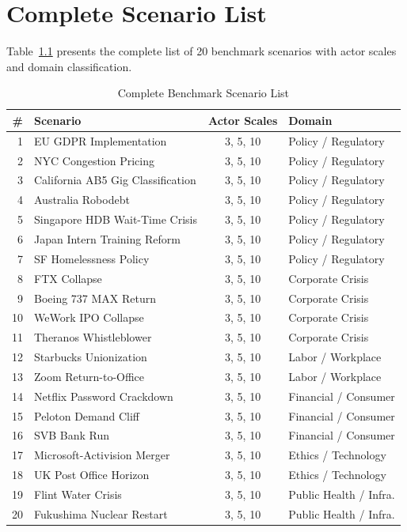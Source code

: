 \documentclass[12pt, a4paper]{report}
\begin{document}
\chapter{Complete Scenario List}
\label{app:scenarios}

Table~\ref{tab:full_scenarios} presents the complete list of 20 benchmark scenarios with actor scales and domain classification.

\begin{table}[t]
\centering
\caption{Complete Benchmark Scenario List}
\label{tab:full_scenarios}
\small
\begin{tabular}{rlcl}
\toprule
\# & Scenario & Actor Scales & Domain \\
\midrule
1  & EU GDPR Implementation & 3, 5, 10 & Policy / Regulatory \\
2  & NYC Congestion Pricing & 3, 5, 10 & Policy / Regulatory \\
3  & California AB5 Gig Classification & 3, 5, 10 & Policy / Regulatory \\
4  & Australia Robodebt & 3, 5, 10 & Policy / Regulatory \\
5  & Singapore HDB Wait-Time Crisis & 3, 5, 10 & Policy / Regulatory \\
6  & Japan Intern Training Reform & 3, 5, 10 & Policy / Regulatory \\
7  & SF Homelessness Policy & 3, 5, 10 & Policy / Regulatory \\
8  & FTX Collapse & 3, 5, 10 & Corporate Crisis \\
9  & Boeing 737 MAX Return & 3, 5, 10 & Corporate Crisis \\
10 & WeWork IPO Collapse & 3, 5, 10 & Corporate Crisis \\
11 & Theranos Whistleblower & 3, 5, 10 & Corporate Crisis \\
12 & Starbucks Unionization & 3, 5, 10 & Labor / Workplace \\
13 & Zoom Return-to-Office & 3, 5, 10 & Labor / Workplace \\
14 & Netflix Password Crackdown & 3, 5, 10 & Financial / Consumer \\
15 & Peloton Demand Cliff & 3, 5, 10 & Financial / Consumer \\
16 & SVB Bank Run & 3, 5, 10 & Financial / Consumer \\
17 & Microsoft-Activision Merger & 3, 5, 10 & Ethics / Technology \\
18 & UK Post Office Horizon & 3, 5, 10 & Ethics / Technology \\
19 & Flint Water Crisis & 3, 5, 10 & Public Health / Infra. \\
20 & Fukushima Nuclear Restart & 3, 5, 10 & Public Health / Infra. \\
\bottomrule
\end{tabular}
\end{table}
\end{document}
